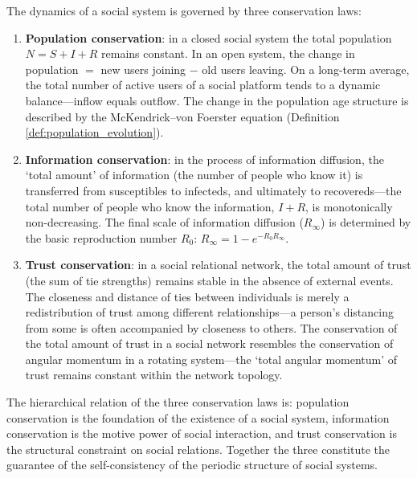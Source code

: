 \begin{theorem}\label{thm:social_conservation}
The dynamics of a social system is governed by three conservation laws:
\begin{enumerate}[label=(\roman*)]
    \item \textbf{Population conservation}: in a closed social system the total population $N = S + I + R$ remains constant. In an open system, the change in population $=$ new users joining $-$ old users leaving. On a long-term average, the total number of active users of a social platform tends to a dynamic balance---inflow equals outflow. The change in the population age structure is described by the McKendrick--von Foerster equation (Definition \ref{def:population_evolution}).
    \item \textbf{Information conservation}: in the process of information diffusion, the `total amount' of information (the number of people who know it) is transferred from susceptibles to infecteds, and ultimately to recovereds---the total number of people who know the information, $I + R$, is monotonically non-decreasing. The final scale of information diffusion ($R_{\infty}$) is determined by the basic reproduction number $R_0$: $R_{\infty} = 1 - e^{-R_0 R_{\infty}}$.
    \item \textbf{Trust conservation}: in a social relational network, the total amount of trust (the sum of tie strengths) remains stable in the absence of external events. The closeness and distance of ties between individuals is merely a redistribution of trust among different relationships---a person's distancing from some is often accompanied by closeness to others. The conservation of the total amount of trust in a social network resembles the conservation of angular momentum in a rotating system---the `total angular momentum' of trust remains constant within the network topology.
\end{enumerate}
The hierarchical relation of the three conservation laws is: population conservation is the foundation of the existence of a social system, information conservation is the motive power of social interaction, and trust conservation is the structural constraint on social relations. Together the three constitute the guarantee of the self-consistency of the periodic structure of social systems.
\end{theorem}

